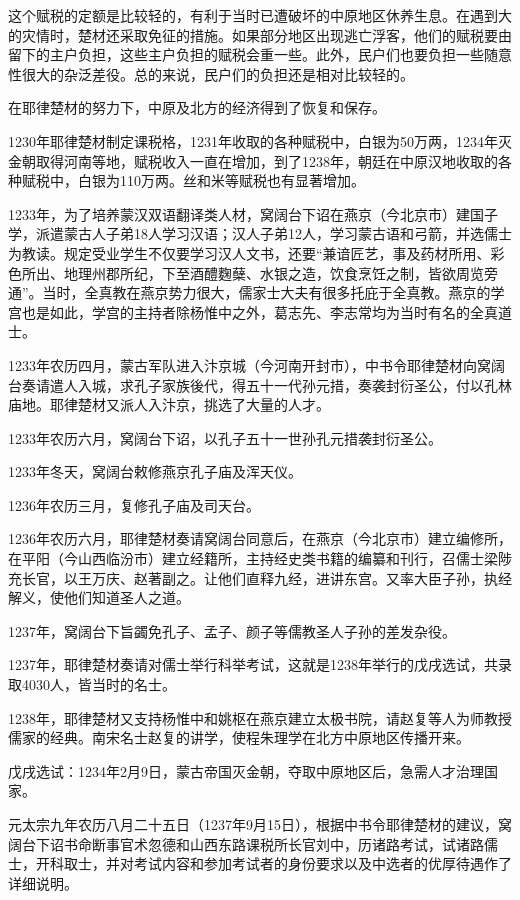 这个赋税的定额是比较轻的，有利于当时已遭破坏的中原地区休养生息。在遇到大的灾情时，楚材还采取免征的措施。如果部分地区出现逃亡浮客，他们的赋税要由留下的主户负担，这些主户负担的赋税会重一些。此外，民户们也要负担一些随意性很大的杂泛差役。总的来说，民户们的负担还是相对比较轻的。

在耶律楚材的努力下，中原及北方的经济得到了恢复和保存。

1230年耶律楚材制定课税格，1231年收取的各种赋税中，白银为50万两，1234年灭金朝取得河南等地，赋税收入一直在增加，到了1238年，朝廷在中原汉地收取的各种赋税中，白银为110万两。丝和米等赋税也有显著增加。

1233年，为了培养蒙汉双语翻译类人材，窝阔台下诏在燕京（今北京市）建国子学，派遣蒙古人子弟18人学习汉语；汉人子弟12人，学习蒙古语和弓箭，并选儒士为教读。规定受业学生不仅要学习汉人文书，还要“兼谙匠艺，事及药材所用、彩色所出、地理州郡所纪，下至酒醴麴蘖、水银之造，饮食烹饪之制，皆欲周览旁通”。当时，全真教在燕京势力很大，儒家士大夫有很多托庇于全真教。燕京的学宫也是如此，学宫的主持者除杨惟中之外，葛志先、李志常均为当时有名的全真道士。

1233年农历四月，蒙古军队进入汴京城（今河南开封市），中书令耶律楚材向窝阔台奏请遣人入城，求孔子家族後代，得五十一代孙元措，奏袭封衍圣公，付以孔林庙地。耶律楚材又派人入汴京，挑选了大量的人才。

1233年农历六月，窝阔台下诏，以孔子五十一世孙孔元措袭封衍圣公。

1233年冬天，窝阔台敕修燕京孔子庙及浑天仪。

1236年农历三月，复修孔子庙及司天台。

1236年农历六月，耶律楚材奏请窝阔台同意后，在燕京（今北京市）建立编修所，在平阳（今山西临汾市）建立经籍所，主持经史类书籍的编纂和刊行，召儒士梁陟充长官，以王万庆、赵著副之。让他们直释九经，进讲东宫。又率大臣子孙，执经解义，使他们知道圣人之道。

1237年，窝阔台下旨蠲免孔子、孟子、颜子等儒教圣人子孙的差发杂役。

1237年，耶律楚材奏请对儒士举行科举考试，这就是1238年举行的戊戌选试，共录取4030人，皆当时的名士。

1238年，耶律楚材又支持杨惟中和姚枢在燕京建立太极书院，请赵复等人为师教授儒家的经典。南宋名士赵复的讲学，使程朱理学在北方中原地区传播开来。

戊戌选试：1234年2月9日，蒙古帝国灭金朝，夺取中原地区后，急需人才治理国家。

元太宗九年农历八月二十五日（1237年9月15日），根据中书令耶律楚材的建议，窝阔台下诏书命断事官术忽德和山西东路课税所长官刘中，历诸路考试，试诸路儒士，开科取士，并对考试内容和参加考试者的身份要求以及中选者的优厚待遇作了详细说明。

